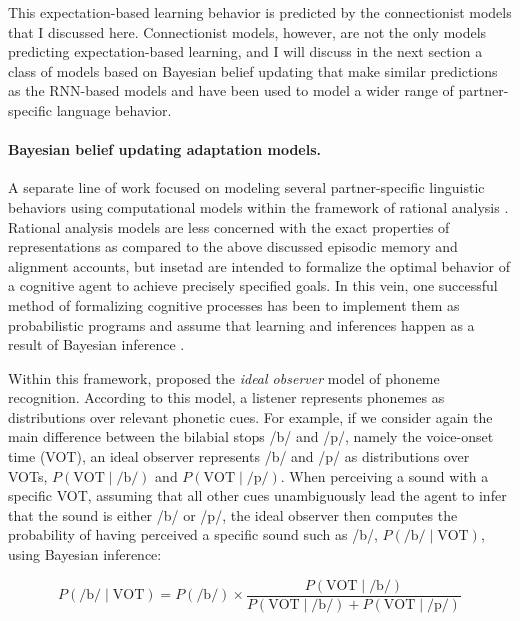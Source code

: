 This expectation-based learning behavior is predicted by the connectionist models that I discussed here. Connectionist models, however, are not the only models predicting expectation-based learning, and I will discuss in the next section a class of models based on Bayesian belief updating that make similar predictions as the RNN-based models and have been used to model a wider range of partner-specific language behavior.

\paragraph{Bayesian belief updating adaptation models.} A separate line of work focused on modeling several partner-specific linguistic behaviors using computational models within 
the framework of rational analysis \cite{Marr1982,Anderson1990}. Rational analysis models are less concerned with the exact properties of representations as 
compared to the above discussed episodic memory and alignment accounts, but insetad are intended to formalize the optimal behavior of a cognitive agent to achieve 
precisely specified goals. In this vein, one successful method of formalizing cognitive processes has been to implement them as probabilistic programs and assume that learning
and inferences happen as a result of Bayesian inference . 

Within this framework, \textcite{Clayards2008} proposed the \textit{ideal observer} model of phoneme recognition. According to this model, a listener represents phonemes as distributions
over relevant phonetic cues. For example, if we consider again the main difference between the bilabial stops /b/ and /p/, namely the voice-onset time (VOT), an ideal observer represents 
/b/ and /p/ as distributions over VOTs, $P(\mbox{VOT}\mid \mbox{/b/})$ and $P(\mbox{VOT}\mid \mbox{/p/})$. When perceiving a sound with a specific VOT, assuming that all other cues 
unambiguously lead the agent to infer that the sound is either /b/ or /p/, the ideal observer then computes the probability of
having perceived a specific sound such as /b/, $P(\mbox{/b/} \mid \mbox{VOT})$, using Bayesian inference:

$$ P(\mbox{/b/} \mid \mbox{VOT}) = P(\mbox{/b/}) \times \frac{P(\mbox{VOT}\mid \mbox{/b/})}{P(\mbox{VOT}\mid \mbox{/b/}) + P(\mbox{VOT}\mid \mbox{/p/})}   $$

